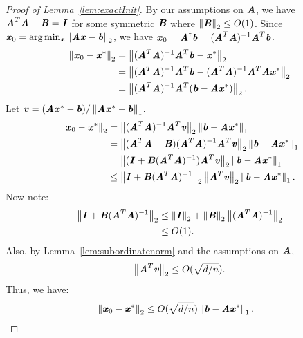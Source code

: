 \begin{proof}[Proof of Lemma~\ref{lem:exactInit}]
	By our assumptions on $\AA$, we have $\AA^T\AA + \BB= \II$ for some symmetric $\BB$ where $\norme{\BB}\le O(1)$. Since $\xx_0 = \arg\min_{\xx} \norm{\AA\xx - \bb}_2$, we have $\xx_0 = \AA^\dagger \bb = (\AA^T \AA)^{-1} \AA^T \bb$.
	\begin{align*}
	\norme{\xx_0-\xx^*} &= \norme{(\AA^T \AA)^{-1} \AA^T \bb - \xx^*}\\
	&= \norme{(\AA^T \AA)^{-1} \AA^T \bb - (\AA^T \AA)^{-1} \AA^T \AA \xx^*}\\
	&= \norme{(\AA^T \AA)^{-1} \AA^T ( \bb - \AA\xx^*)}.
	\end{align*}
	Let $\vv = (\AA \xx^* - \bb)/\norm{\AA \xx^* - \bb}_1$.
	\begin{align*}
	\norme{\xx_0 -\xx^*} &= \norme{(\AA^T \AA)^{-1} \AA^T \vv}\norm{\bb - \AA\xx^*}_1\\
	&= \norme{(\AA^T \AA + \BB)(\AA^T \AA)^{-1} \AA^T \vv}\norm{\bb - \AA\xx^*}_1\\
	&= \norme{(\II + \BB (\AA^T \AA)^{-1}) \AA^T \vv}\norm{\bb - \AA\xx^*}_1\\
	&\le \norme{\II + \BB (\AA^T \AA)^{-1}}\norme{\AA^T \vv}\norm{\bb - \AA\xx^*}_1.
	\end{align*}
	Now note:
	\begin{align*}
	\norme{\II + \BB (\AA^T \AA)^{-1}}&\le \norme{\II} + \norme{\BB}\norme{(\AA^T \AA)^{-1}}\\
	&\le O(1).
	\end{align*}
	Also, by Lemma~\ref{lem:subordinatenorm} and the assumptions on $\AA$,
	\begin{align*}
	\norme{\AA^T \vv} \leq O(\sqrt{d/n}).
	\end{align*}
	Thus, we have:
	\begin{align*}
	& \norme{\xx_0 - \xx^*} \le O(\sqrt{d/n}) \norm{\bb - \AA\xx^*}_1. 
	\end{align*}
\end{proof}


